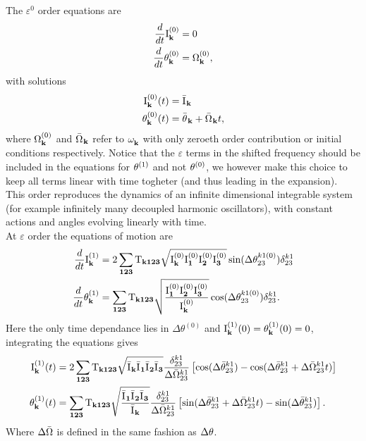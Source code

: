 The $\varepsilon^0$ order equations are
\begin{align}
    \frac{d}{dt}\mathrm{I}^{(0)}_\mathbf{k} &= 0   \\
    \frac{d}{dt}\theta^{(0)}_\mathbf{k} &= \Omega^{(0)}_\mathbf{k}, 
\end{align}
with solutions 
\begin{align}
    \mathrm{I}^{(0)}_\mathbf{k}(t) &= \bar{\mathrm{I}^{}}_\mathbf{k} \label{solzero1}\\
    \theta^{(0)}_\mathbf{k}(t) &= \bar{\theta^{}}_\mathbf{k} + \bar{\Omega^{}}_\mathbf{k}t, \label{solzero2}
\end{align}
where $\Omega^{(0)}_\mathbf{k}$ and $\bar{\Omega^{}}_\mathbf{k}$ refer to $\omega^{}_{\mathbf{k}}$ with only zeroeth order contribution or initial conditions respectively.
Notice that the $\varepsilon$ terms in 
the shifted frequency should be included in the equations for $\theta^{(1)}$ and not $\theta^{(0)}$, we however make this choice to keep 
all terms linear with time togheter (and thus leading in the expansion).\\
This order reproduces the dynamics of an infinite dimensional integrable system (for example infinitely many decoupled harmonic oscillators), with constant actions and angles evolving linearly with time. \\

At $\varepsilon$ order the equations of motion are 
\begin{align}
    \frac{d}{dt}\mathrm{I}^{(1)}_\mathbf{k} &= 2\sum_{\mathbf{123}} \mathrm{T}_{\mathbf{k123}} \sqrt{\mathrm{I}^{(0)}_\mathbf{k}\mathrm{I}^{(0)}_\mathbf{1}\mathrm{I}^{(0)}_\mathbf{2}\mathrm{I}^{(0)}_\mathbf{3}} \sin(\Delta\theta^{k1(0)}_{23})\delta^{k1}_{23} \label{hameqone}\\
    \frac{d}{dt}\theta^{(1)}_\mathbf{k} &= \sum_{\mathbf{123}} \mathrm{T}_{\mathbf{k123}} \sqrt{\frac{\mathrm{I}^{(0)}_\mathbf{1}\mathrm{I}^{(0)}_\mathbf{2}\mathrm{I}^{(0)}_\mathbf{3}}{\mathrm{I}^{(0)}_\mathbf{k}}}\cos(\Delta\theta^{k1(0)}_{23})\delta^{k1}_{23}.
\end{align}
Here the only time dependance lies in $\Delta\theta^{(0)}$ and $\mathrm{I}^{(1)}_\mathbf{k}(0) = \theta^{(1)}_\mathbf{k}(0) = 0$, integrating the equations gives
\begin{align}
    \mathrm{I}^{(1)}_\mathbf{k}(t) &= 2\sum_{\mathbf{123}} \mathrm{T}_{\mathbf{k123}} \sqrt{\bar{\mathrm{I}^{}}_\mathbf{k}\bar{\mathrm{I}^{}}_\mathbf{1}\bar{\mathrm{I}^{}}_\mathbf{2}\bar{\mathrm{I}^{}}_\mathbf{3}} \frac{\delta^{k1}_{23}}{\Delta\bar{\Omega}^{k1}_{23}}
    \left[ \cos(\Delta\bar{\theta}^{k1}_{23}) - \cos(\Delta\bar{\theta}^{k1}_{23} + \Delta\bar{\Omega}^{k1}_{23}t) \right] \label{solone1}\\
    \theta^{(1)}_\mathbf{k}(t) &= \sum_{\mathbf{123}} \mathrm{T}_{\mathbf{k123}} \sqrt{\frac{\bar{\mathrm{I}^{}}_\mathbf{1}\bar{\mathrm{I}^{}}_\mathbf{2}\bar{\mathrm{I}^{}}_\mathbf{3}}{\bar{\mathrm{I}^{}}_\mathbf{k}}} \frac{\delta^{k1}_{23}}{\Delta\bar{\Omega}^{k1}_{23}}
    \left[ \sin(\Delta\bar{\theta}^{k1}_{23} + \Delta\bar{\Omega}^{k1}_{23}t) -\sin(\Delta\bar{\theta}^{k1}_{23}) \right]. \label{solone2}
\end{align}
Where $\Delta\bar{\Omega}$ is defined in the same fashion as $\Delta\theta$. \\

